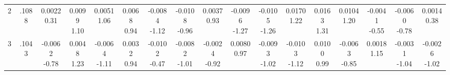 \begin{landscape}
\begin{center}
{\begin{adjustbox}{max width=\textheight}
\begin{tabular}{lcccccccccccccccc}
2 & .1088 & \shortstack{0.0022\\0.31} & \shortstack{0.0099\\1.10} & \shortstack{0.0051\\1.06} & \shortstack{0.0068\\0.94} & \shortstack{-0.0084\\-1.12} & \shortstack{-0.0108\\-0.96} & \shortstack{0.0037\\0.93} & \shortstack{-0.0096\\-1.27} & \shortstack{-0.0105\\-1.26} & \shortstack{0.0170\\1.22} & \shortstack{0.0163\\1.31} & \shortstack{0.0104\\1.20} & \shortstack{-0.0041\\-0.55} & \shortstack{-0.0060\\-0.78} & \shortstack{0.0014\\0.38} \\
3 & .1043 & \shortstack{-0.0062\\-0.78} & \shortstack{0.0048\\1.23} & \shortstack{-0.0064\\-1.11} & \shortstack{0.0032\\0.94} & \shortstack{-0.0102\\-0.47} & \shortstack{-0.0082\\-1.01} & \shortstack{-0.0024\\-0.92} & \shortstack{0.0080\\0.97} & \shortstack{-0.0093\\-1.02} & \shortstack{-0.0103\\-1.12} & \shortstack{0.0100\\0.99} & \shortstack{-0.0063\\-0.85} & \shortstack{0.0018\\1.15} & \shortstack{-0.0031\\-1.04} & \shortstack{-0.0026\\-1.02} \\

\end{tabular}
\end{adjustbox}}
\end{center}
\end{landscape}
